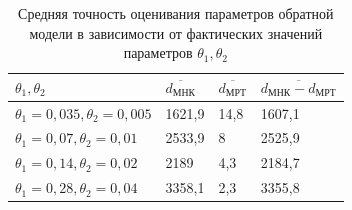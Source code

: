 \begin{table}[b]
  \caption{%
    Средняя точность оценивания параметров обратной модели в
    зависимости от фактических значений параметров \( \theta_1, \theta_2 \)
  }\label{tbl:comparison_nonlinear_inverse}
  \small
  \begin{tabular}{| m{5cm} | M{3.3cm} | M{3.3cm} | M{3.5cm} |}
    \hline
    \( \theta_1, \theta_2 \)
    & \( \overline{d_{\text{МНК}}} \)
    & \( \overline{d_{\text{МРТ}}} \)
    & \( \overline{d_{\text{МНК}} - d_{\text{МРТ}}} \) \\
    \hline
    \( \theta_1 = 0{,}035, \theta_2 = 0{,}005 \)
    & 1621{,}9
    & 14{,}8
    & 1607{,}1 \\
    \hline
    \( \theta_1 = 0{,}07, \theta_2 = 0{,}01 \)
    & 2533{,}9
    & 8
    & 2525{,}9 \\
    \hline
    \( \theta_1 = 0{,}14, \theta_2 = 0{,}02 \)
    & 2189
    & 4{,}3
    & 2184{,}7 \\
    \hline
    \( \theta_1 = 0{,}28, \theta_2 = 0{,}04 \)
    & 3358{,}1
    & 2{,}3
    & 3355{,}8 \\
    \hline
  \end{tabular}
\end{table}

